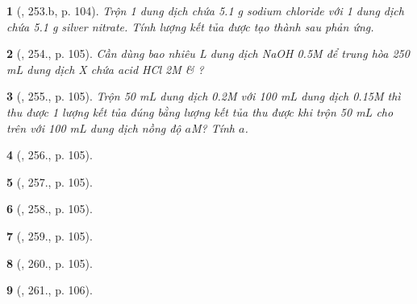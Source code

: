 \documentclass{article}
\newtheorem{baitoan}{}
\begin{document}
\begin{baitoan}[\cite{Nguyen_Buu_Can_500_BT_Hoa_Hoc_THCS}, 253.b, p. 104]
	Trộn 1 dung dịch chứa {\rm5.1 g} sodium chloride với 1 dung dịch chứa {\rm5.1 g} silver nitrate. Tính lượng kết tủa được tạo thành sau phản ứng.
\end{baitoan}

\begin{baitoan}[\cite{Nguyen_Buu_Can_500_BT_Hoa_Hoc_THCS}, 254., p. 105]
	Cần dùng bao nhiêu {\rm L} dung dịch {\rm NaOH 0.5M} để trung hòa {\rm250 mL} dung dịch X chứa acid {\rm HCl 2M \& }?
\end{baitoan}

\begin{baitoan}[\cite{Nguyen_Buu_Can_500_BT_Hoa_Hoc_THCS}, 255., p. 105]
	Trộn {\rm50 mL} dung dịch {\rm{} 0.2M} với {\rm100 mL} dung dịch {\rm{} 0.15M} thì thu được 1 lượng kết tủa đúng bằng lượng kết tủa thu được khi trộn {\rm50 mL } cho trên với {\rm100 mL} dung dịch {\rm{}} nồng độ $a${\rm M}? Tính $a$.
\end{baitoan}

\begin{baitoan}[\cite{Nguyen_Buu_Can_500_BT_Hoa_Hoc_THCS}, 256., p. 105]
	
\end{baitoan}

\begin{baitoan}[\cite{Nguyen_Buu_Can_500_BT_Hoa_Hoc_THCS}, 257., p. 105]
	
\end{baitoan}

\begin{baitoan}[\cite{Nguyen_Buu_Can_500_BT_Hoa_Hoc_THCS}, 258., p. 105]
	
\end{baitoan}

\begin{baitoan}[\cite{Nguyen_Buu_Can_500_BT_Hoa_Hoc_THCS}, 259., p. 105]
	
\end{baitoan}

\begin{baitoan}[\cite{Nguyen_Buu_Can_500_BT_Hoa_Hoc_THCS}, 260., p. 105]
	
\end{baitoan}

\begin{baitoan}[\cite{Nguyen_Buu_Can_500_BT_Hoa_Hoc_THCS}, 261., p. 106]
	
\end{baitoan}
\end{document}
